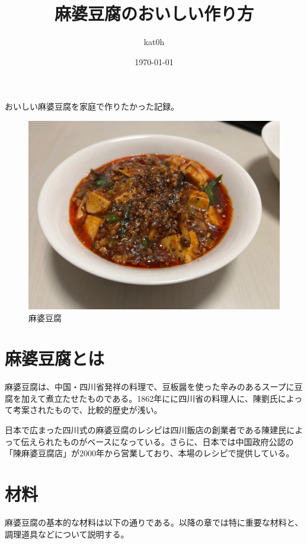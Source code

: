 \documentclass[a4paper,10pt,xelatex,ja=standard,twocolumn]{bxjsarticle}
\title{麻婆豆腐のおいしい作り方}
\author{kat0h}
\date{\today}
\begin{document}
\maketitle

おいしい麻婆豆腐を家庭で作りたかった記録。

\begin{figure}[h]
  \caption{麻婆豆腐}
  \label{mapo_top}
  \begin{center}
    \includegraphics[width=\linewidth]{IMG_3694.jpg}
  \end{center}
\end{figure}


\section{麻婆豆腐とは}

麻婆豆腐は、中国・四川省発祥の料理で、豆板醤を使った辛みのあるスープに豆腐を加えて煮立たせたものである。1862年にに四川省の料理人に、陳劉氏によって考案されたもので、比較的歴史が浅い。\cite{1}

日本で広まった四川式の麻婆豆腐のレシピは四川飯店の創業者である陳建民によって伝えられたものがベースになっている。さらに、日本では中国政府公認の「陳麻婆豆腐店」が2000年から営業しており、本場のレシピで提供している。\\

\section{材料}

麻婆豆腐の基本的な材料は以下の通りである。以降の章では特に重要な材料と、調理道具などについて説明する。
\end{document}
